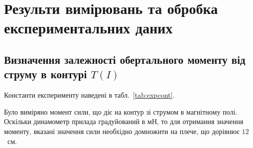 \documentclass{LabWorkTemplate}
\begin{document}
\section{Результи вимірювань та обробка експериментальних даних}

\subsection{Визначення залежності обертального моменту від струму в контурі $T(I)$}

%
Константи експерименту наведені в табл.~\ref{tab:expcont}.


%

Було виміряно момент сили, що діє на контур зі струмом в магнітному полі. Оскільки динамометр прилада градуйований в мН, то для отримання значення моменту, вказані значення сили необхідно домножити на плече, що дорівнює $12$~см.

{}\TorqueVsCurrentTable
\TorqueVsCurrentTable
\end{document}
